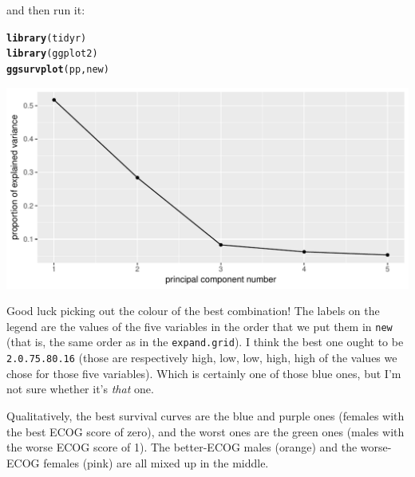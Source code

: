 \documentclass{article}\usepackage[]{graphicx}\usepackage[]{color}
\makeatletter
\def\maxwidth{ %
  \ifdim\Gin@nat@width>\linewidth
    \linewidth
  \else
    \Gin@nat@width
  \fi
}
\newcommand{\hlstd}[1]{\textcolor[rgb]{0.345,0.345,0.345}{#1}}%
\newcommand{\hlkwd}[1]{\textcolor[rgb]{0.737,0.353,0.396}{\textbf{#1}}}%
\newenvironment{kframe}{%
 \def\at@end@of@kframe{}%
 \ifinner\ifhmode%
  \def\at@end@of@kframe{\end{minipage}}%
  \begin{minipage}{\columnwidth}%
 \fi\fi%
 \def\FrameCommand##1{\hskip\@totalleftmargin \hskip-\fboxsep
 \colorbox{shadecolor}{##1}\hskip-\fboxsep
     \hskip-\linewidth \hskip-\@totalleftmargin \hskip\columnwidth}%
 \MakeFramed {\advance\hsize-\width
   \@totalleftmargin\z@ \linewidth\hsize
   \@setminipage}}%
 {\par\unskip\endMakeFramed%
 \at@end@of@kframe}
\newenvironment{knitrout}{}{} %
\makeatother
\begin{document}
and then run it:

\begin{knitrout}
\color{fgcolor}\begin{kframe}
\begin{alltt}
\hlkwd{library}\hlstd{(tidyr)}
\hlkwd{library}\hlstd{(ggplot2)}
\hlkwd{ggsurvplot}\hlstd{(pp,new)}
\end{alltt}
\end{kframe}
\includegraphics[width=\maxwidth]{figure/unnamed-chunk-20-1} 

\end{knitrout}

Good luck picking out the colour of the best combination! The labels
on the legend are the values of the five variables in the order that we put them in
\texttt{new} (that is, the same order as in the
\texttt{expand.grid}). I think the best one ought to be
\texttt{2.0.75.80.16} (those are respectively high, low, low, high,
high of the values we chose for those five variables). Which is
certainly one of those blue ones, but I'm not sure whether it's
\emph{that} one.

Qualitatively, the best survival curves are the blue and purple ones
(females with the best ECOG score of zero), and the worst ones are the
green ones (males with the worse ECOG score of 1). The better-ECOG
males (orange) and the worse-ECOG females (pink) are all  mixed up in
the middle.
\end{document}
